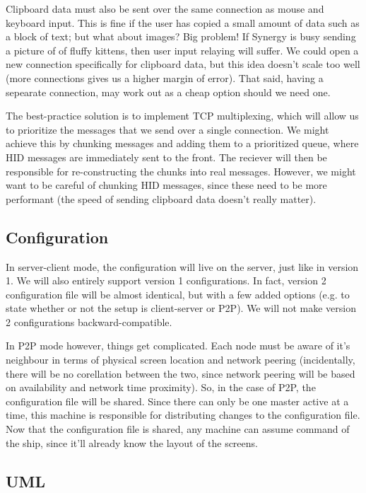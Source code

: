Clipboard data must also be sent over the same connection as mouse and
keyboard input. This is fine if the user has copied a small amount of data
such as a block of text; but what about images? Big problem! If Synergy is busy
sending a picture of of fluffy kittens, then user input relaying will suffer.
We could open a new connection specifically for clipboard data, but this idea
doesn't scale too well (more connections gives us a higher margin of error).
That said, having a sepearate connection, may work out as a cheap option
should we need one.

The best-practice solution is to implement TCP multiplexing, which will allow 
us to prioritize the messages that we send over a single connection. We
might achieve this by chunking messages and adding them to a prioritized queue,
where HID messages are immediately sent to the front. The reciever will then
be responsible for re-constructing the chunks into real messages. However,
we might want to be careful of chunking HID messages, since these need to be
more performant (the speed of sending clipboard data doesn't really matter).

\subsection{Configuration}

In server-client mode, the configuration will live on the server, just like in
version 1. We will also entirely support version 1 configurations. In fact, 
version 2 configuration file will be almost identical, but with a few added
options (e.g. to state whether or not the setup is client-server or P2P). We 
will not make version 2 configurations backward-compatible.

In P2P mode however, things get complicated. Each node must be aware of it's
neighbour in terms of physical screen location and network peering
(incidentally, there will be no corellation between the two, since network 
peering will be based on availability and network time proximity). So, in the
case of P2P, the configuration file will be shared. Since there can only be
one master active at a time, this machine is responsible for distributing
changes to the configuration file. Now that the configuration file is shared,
any machine can assume command of the ship, since it'll already know the layout
of the screens.

\clearpage
\subsection{UML}

